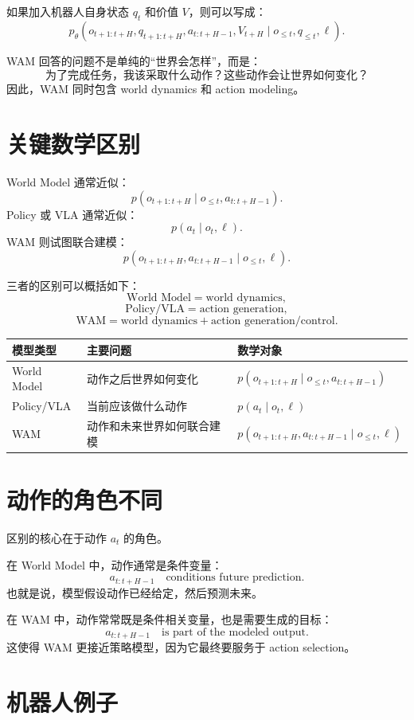 \documentclass[11pt,a4paper]{ctexart}
\begin{document}
如果加入机器人自身状态 $q_t$ 和价值 $V$，则可以写成：
\[
  p_\theta(o_{t+1:t+H},q_{t+1:t+H},a_{t:t+H-1},V_{t+H}
  \mid o_{\le t},q_{\le t},\ell).
\]

WAM 回答的问题不是单纯的“世界会怎样”，而是：
\[
  \text{为了完成任务，我该采取什么动作？这些动作会让世界如何变化？}
\]
因此，WAM 同时包含 world dynamics 和 action modeling。

\section{关键数学区别}

World Model 通常近似：
\[
  p(o_{t+1:t+H}\mid o_{\le t},a_{t:t+H-1}).
\]
Policy 或 VLA 通常近似：
\[
  p(a_t\mid o_t,\ell).
\]
WAM 则试图联合建模：
\[
  p(o_{t+1:t+H},a_{t:t+H-1}\mid o_{\le t},\ell).
\]

三者的区别可以概括如下：
\[
  \text{World Model} = \text{world dynamics},
\]
\[
  \text{Policy/VLA} = \text{action generation},
\]
\[
  \text{WAM} = \text{world dynamics}+\text{action generation/control}.
\]

\begin{center}
\begin{tabular}{lll}
\toprule
模型类型 & 主要问题 & 数学对象 \\
\midrule
World Model & 动作之后世界如何变化 &
$p(o_{t+1:t+H}\mid o_{\le t},a_{t:t+H-1})$ \\
Policy/VLA & 当前应该做什么动作 &
$p(a_t\mid o_t,\ell)$ \\
WAM & 动作和未来世界如何联合建模 &
$p(o_{t+1:t+H},a_{t:t+H-1}\mid o_{\le t},\ell)$ \\
\bottomrule
\end{tabular}
\end{center}

\section{动作的角色不同}

区别的核心在于动作 $a_t$ 的角色。

在 World Model 中，动作通常是条件变量：
\[
  a_{t:t+H-1}\quad \text{conditions future prediction}.
\]
也就是说，模型假设动作已经给定，然后预测未来。

在 WAM 中，动作常常既是条件相关变量，也是需要生成的目标：
\[
  a_{t:t+H-1}\quad \text{is part of the modeled output}.
\]
这使得 WAM 更接近策略模型，因为它最终要服务于 action selection。

\section{机器人例子}
\end{document}
